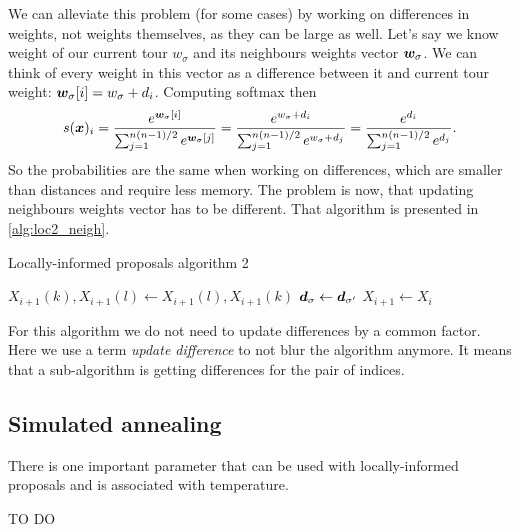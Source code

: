 		We can alleviate this problem (for some cases) by working on differences in weights, not weights themselves, as they can be large as well. Let's say we know weight of our current tour $w_\sigma$ and its neighbours weights vector $\bm{w}_\sigma$. We can think of every weight in this vector as a difference between it and current tour weight: $\bm{w}_{\sigma}[i] = w_\sigma + d_i$. Computing softmax then
		\begin{equation*}
			s(\bm{x})_i = \frac{e^{\bm{w}_{\sigma}[i]}}{\sum_{j=1}^{n(n-1)/2} e^{\bm{w}_{\sigma}[j]}} =\frac{e^{w_\sigma + d_i}}{\sum_{j=1}^{n(n-1)/2} e^{w_\sigma + d_j}} = \frac{e^{d_i}}{\sum_{j=1}^{n(n-1)/2} e^{d_j}}.
		\end{equation*}
		So the probabilities are the same when working on differences, which are smaller than distances and require less memory. The problem is now, that updating neighbours weights vector has to be different. That algorithm is presented in \ref{alg:loc2_neigh}.
		\begin{algorithm}
			\caption{Locally-informed proposals algorithm 2}\label{alg:loc2_neigh}
			\begin{algorithmic}[1]
				
					
					
								  
							\EndIf
						\EndFor
					\EndFor
					
						\State $X_{i+1}(k), X_{i+1}(l) \gets X_{i+1}(l), X_{i+1}(k)$
						\State $\bm{d}_{\sigma} \gets \bm{d}_{\sigma'}$
					\Else
						\State $X_{i+1} \gets X_i$
					\EndIf
				\EndFor
			\end{algorithmic}
		\end{algorithm}
		For this algorithm we do not need to update differences by a common factor. Here we use a term \textit{update difference} to not blur the algorithm anymore. It means that a sub-algorithm is getting differences for the pair of indices.
		
\subsection{Simulated annealing}
	There is one important parameter that can be used with locally-informed proposals and is associated with temperature.
	
	TO DO